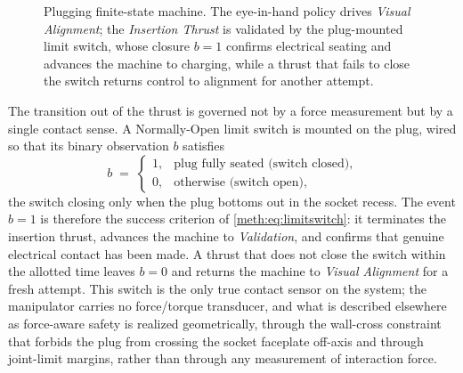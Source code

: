 \begin{figure}[!htb]
\centering
{}
\caption{Plugging finite-state machine. The eye-in-hand policy drives \emph{Visual Alignment}; the \emph{Insertion Thrust} is validated by the plug-mounted limit switch, whose closure $b{=}1$ confirms electrical seating and advances the machine to charging, while a thrust that fails to close the switch returns control to alignment for another attempt.}
\label{meth:fig:manippipe}
\end{figure}

The transition out of the thrust is governed not by a force measurement but by a single contact sense. A Normally-Open limit switch is mounted on the plug, wired so that its binary observation $b$ satisfies
\begin{equation}
  b \;=\;
  \begin{cases}
    1, & \text{plug fully seated (switch closed)},\\
    0, & \text{otherwise (switch open)},
  \end{cases}
  \label{meth:eq:limitswitch}
\end{equation}
the switch closing only when the plug bottoms out in the socket recess. The event $b=1$ is therefore the success criterion of \eqref{meth:eq:limitswitch}: it terminates the insertion thrust, advances the machine to \emph{Validation}, and confirms that genuine electrical contact has been made. A thrust that does not close the switch within the allotted time leaves $b=0$ and returns the machine to \emph{Visual Alignment} for a fresh attempt. This switch is the only true contact sensor on the system; the manipulator carries no force/torque transducer, and what is described elsewhere as force-aware safety is realized geometrically, through the wall-cross constraint that forbids the plug from crossing the socket faceplate off-axis and through joint-limit margins, rather than through any measurement of interaction force.

